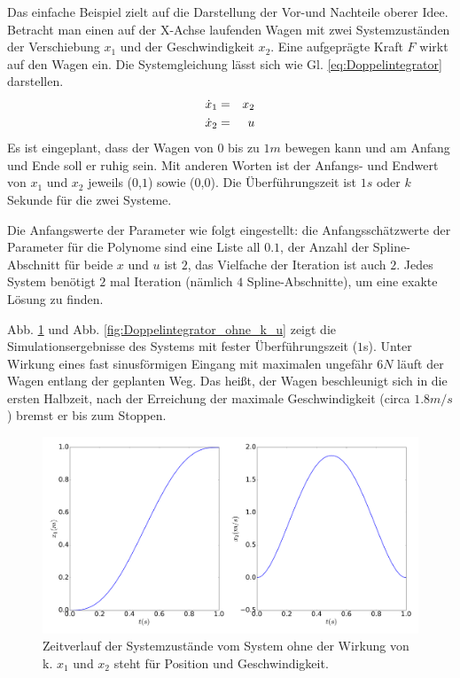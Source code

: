 \begin{beispiel}[Doppelintegrator]
	Das einfache Beispiel zielt auf die Darstellung der Vor-und Nachteile oberer Idee. Betracht man einen auf der X-Achse laufenden Wagen mit zwei Systemzuständen der Verschiebung $x_{1}$ und der Geschwindigkeit $x_{2}$. Eine aufgeprägte Kraft $F$ wirkt auf den Wagen ein. Die Systemgleichung lässt sich wie Gl. \ref{eq:Doppelintegrator} darstellen.
	\begin{eqnarray}
	\dot{x}_{1} &=& x_{2}\notag\\
	\dot{x}_{2} &=& u
	\label{eq:Doppelintegrator}
	\end{eqnarray}
	Es ist eingeplant, dass der Wagen von $0$ bis zu $1m$ bewegen kann und am Anfang und Ende soll er ruhig sein. Mit anderen Worten ist der Anfangs- und Endwert von $x_{1}$ und $x_{2}$ jeweils ($0$,$1$) sowie ($0$,$0$). Die Überführungszeit ist $1s$ oder $k$ Sekunde für die zwei Systeme. 
	
	Die Anfangswerte der Parameter wie folgt eingestellt: die Anfangsschätzwerte der Parameter für die Polynome sind eine Liste all $0.1$, der Anzahl der Spline-Abschnitt für beide $x$ und $u$ ist $2$, das Vielfache der Iteration ist auch $2$. Jedes System benötigt $2$ mal Iteration (nämlich $4$ Spline-Abschnitte), um eine exakte Lösung zu finden.
	
	Abb. \ref{fig:Doppelintegrator_ohne_k_x} und Abb. \ref{fig:Doppelintegrator_ohne_k_u} zeigt die Simulationsergebnisse des Systems mit fester Überführungszeit ($1$s). Unter Wirkung  eines fast sinusförmigen Eingang mit maximalen ungefähr $6N$ läuft der Wagen entlang der geplanten Weg. Das heißt, der Wagen beschleunigt sich in die ersten Halbzeit, nach der Erreichung der maximale Geschwindigkeit (circa $1.8m/s$) bremst er bis zum Stoppen.
	\begin{figure}
		\centering
		\includegraphics[width=15.5cm]{bild/30_32/test0_ohne_k_ori_x.pdf}
		\caption{Zeitverlauf der Systemzustände vom System ohne der Wirkung von k. $x_{1}$ und $x_{2}$ steht für Position und Geschwindigkeit.}
		\label{fig:Doppelintegrator_ohne_k_x}
	\end{figure}
	

\end{beispiel}
